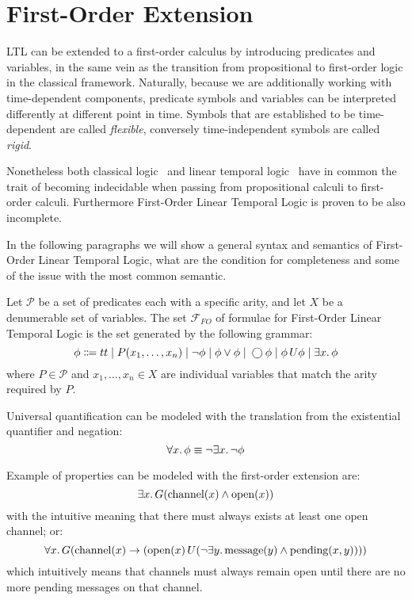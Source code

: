 \section{First-Order Extension}

LTL can be extended to a first-order calculus by introducing predicates and variables, in the same vein as the
transition from propositional to first-order logic in the classical framework. Naturally, because we are additionally
working with time-dependent components, predicate symbols and variables can be interpreted differently at different
point in time. Symbols that are established to be time-dependent are called \emph{flexible}, conversely time-independent
symbols are called \emph{rigid}.

Nonetheless both classical logic~\cite{turing_computable_1937} and linear temporal logic~\cite{merz_decidability_1992}
have in common the trait of becoming indecidable when passing from propositional calculi to first-order calculi.
Furthermore First-Order Linear Temporal Logic is proven to be also incomplete.

In the following paragraphs we will show a general syntax and semantics of First-Order Linear Temporal Logic, what are
the condition for completeness and some of the issue with the most common semantic.

\begin{definition}\label{def:kripkefoltlsyn}
  Let $\mathcal{P}$ be a set of predicates each with a specific arity, and let $X$ be a denumerable set of variables.
  The set $\mathcal{F}_{FO}$ of formulae for First-Order Linear Temporal Logic is the set generated by the following grammar:
  \[
    \phi \Coloneqq tt \;|\; P(x_1, \ldots, x_n)
                      \;|\; \neg\phi
                      \;|\; \phi \lor \phi
                      \;|\; \bigcirc{\phi}
                      \;|\; {\phi}\,U {\phi}
                      \;|\; \exists {x} \ldotp {\phi}
  \]
  where $P \in \mathcal{P}$ and $x_1, \ldots, x_n \in X$ are individual variables that match the arity required by $P$.
\end{definition}
Universal quantification can be modeled with the translation from the existential quantifier and negation:
\[
  \forall {x} \ldotp {\phi} \equiv \neg\exists {x} \ldotp {\neg\phi}
\]

Example of properties can be modeled with the first-order extension are:
\[
  \exists {x} \ldotp {G(\text{channel}(x) \land \text{open}(x))}
\]
with the intuitive meaning that there must always exists at least one open channel; or:
\[
  \forall {x} \ldotp {G(\text{channel}(x) \to ({\text{open}(x)}\,U {(\neg\exists {y} \ldotp {\text{message}(y) \land \text{pending}(x, y)})}))}
\]
which intuitively means that channels must always remain open until there are no more pending messages on that channel.

